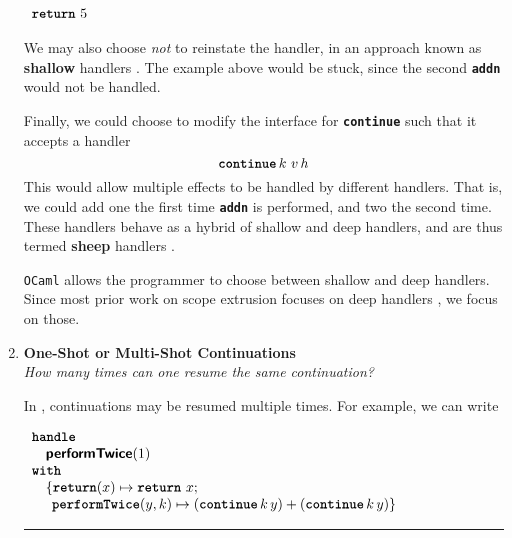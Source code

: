 \begin{enumerate}
\begin{efflst}
          \textcolor{effComment}{$\begin{array}{l}\texttt{\textbf{return}} \,\, {5}\end{array}$}
        \end{efflst}

        We may also choose \textit{not} to reinstate the handler, in an approach known as \textbf{shallow} handlers \citep{hillestrom-2018}. The example above would be stuck, since the second \textbf{\texttt{addn}} would not be handled.

        Finally, we could choose to modify the interface for \textbf{\texttt{continue}} such that it accepts a handler
        \[\textbf{\texttt{continue}} \, k \,  \, v \, h\]
        This would allow multiple effects to be handled by different handlers. That is, we could add one the first time \textbf{\texttt{addn}} is performed, and two the second time. These handlers behave as a hybrid of shallow and deep handlers, and are thus termed \textbf{sheep} handlers \citep{phipps-costin-2023}. 
         
        \texttt{OCaml} allows the programmer to choose between shallow and deep handlers. Since most prior work on scope extrusion focuses on deep handlers \citep{isoda-24}, we focus on those. 

        \item \textbf{\textsf{One-Shot or Multi-Shot Continuations}}\\
        \textit{How many times can one resume the same continuation?}
 
        In \efflang{}, continuations may be resumed multiple times. For example, we can write 
        
        \begin{efflst}
          $\begin{array}{l}
            \textbf{\texttt{handle}} \\
            \quad \textbf{\textsf{performTwice}}(1) \\
            \textbf{\texttt{with}} \\
            \quad \{ \textbf{\texttt{return}}(x) \mapsto {\texttt{\textbf{return}} \,\, {x}}; \\
            \quad \; \, \textbf{\texttt{performTwice}}(y, k) \mapsto (\textbf{\texttt{continue}} \, {k} \, {y}) + (\textbf{\texttt{continue}} \, {k} \, {y}) \}\\
          \end{array}$
          \vspace{2mm} 
          \textcolor{effComment}{\hrule height 0.2mm \relax}
          \vspace{2mm} 
          

\end{efflst}
\end{enumerate}
